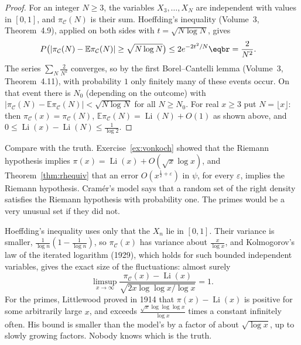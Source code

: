 \begin{proof}
For an integer $N\ge3$, the variables $X_3,\dots,X_N$ are independent with values in $[0,1]$, and $\pi_{\mathcal C}(N)$ is their sum. Hoeffding's inequality (Volume~3, Theorem~4.9), applied on both sides with
$t=\sqrt{N\log N}$, gives
\[
\begin{aligned}P\bigl(|\pi_{\mathcal C}(N)-\mathbb E\pi_{\mathcal C}(N)|\ge\sqrt{N\log N}\bigr)&\le2e^{-2t^2/N}\eqbr=\frac2{N^2}.\end{aligned}
\]
The series $\sum_N\frac2{N^2}$ converges, so by the first Borel--Cantelli lemma (Volume~3, Theorem~4.11), with probability $1$ only finitely many of these events occur. On that event there is
$N_0$ (depending on the outcome) with $|\pi_{\mathcal C}(N)-\mathbb E\pi_{\mathcal C}(N)|<\sqrt{N\log N}$ for all $N\ge N_0$. For real $x\ge3$ put $N=\lfloor x\rfloor$: then $\pi_{\mathcal C}(x)=\pi_{\mathcal C}(N)$,
$\mathbb E\pi_{\mathcal C}(N)=\operatorname{Li}(N)+O(1)$ as shown above, and $0\le\operatorname{Li}(x)-\operatorname{Li}(N)\le\frac1{\log2}$.
\end{proof}

Compare with the truth. Exercise~\ref{ex:vonkoch} showed that the Riemann hypothesis implies $\pi(x)=\operatorname{Li}(x)+O(\sqrt x\log x)$, and Theorem~\ref{thm:rhequiv} that an error
$O(x^{\frac12+\varepsilon})$ in $\psi$, for every $\varepsilon$, implies the Riemann hypothesis. Cramér's model says that a random set of the right density satisfies the Riemann hypothesis with probability one. The primes would be a very unusual set if
they did not.

\begin{remark}
Hoeffding's inequality uses only that the $X_n$ lie in $[0,1]$. Their variance is smaller, $\frac1{\log n}(1-\frac1{\log n})$, so $\pi_{\mathcal C}(x)$ has variance about $\frac x{\log x}$, and Kolmogorov's
law of the iterated logarithm (1929), which holds for such bounded independent variables, gives the exact size of the fluctuations: almost surely
\[
\limsup_{x\to\infty}\frac{\pi_{\mathcal C}(x)-\operatorname{Li}(x)}{\sqrt{2x\log\log x/\log x}}=1.
\]
For the primes, Littlewood proved in 1914 that $\pi(x)-\operatorname{Li}(x)$ is positive for some arbitrarily large $x$, and exceeds $\frac{\sqrt x\log\log\log x}{\log x}$ times a constant infinitely often.
His bound is smaller than the model's by a factor of about $\sqrt{\log x}$, up to slowly growing factors. Nobody knows which is the truth.
\end{remark}

